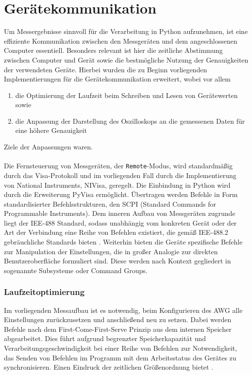 \documentclass[../Report.tex]{subfiles}
\begin{document}
\section{Gerätekommunikation}
\label{sec:vorg.geraete}

Um Messergebnisse sinnvoll für die Verarbeitung in Python aufzunehmen, ist eine effiziente Kommunikation zwischen den Messgeräten und dem angeschlossenen Computer essentiell. Besonders relevant ist hier die zeitliche Abstimmung zwischen Computer und Gerät sowie die bestmögliche Nutzung der Genauigkeiten der verwendeten Geräte. 
Hierbei wurden die zu Beginn vorliegenden Implementierungen für die Gerätekommunikation erweitert, wobei vor allem
\begin{enumerate}
	\item die Optimierung der Laufzeit beim Schreiben und Lesen von Gerätewerten sowie
	\item die Anpassung der Darstellung des Oszilloskops an die gemessenen Daten für eine höhere Genauigkeit
\end{enumerate}
Ziele der Anpassungen waren.
\\
\\
Die Fernsteuerung von Messgeräten, der \lstinline{Remote}-Modus, wird standardmäßig durch das Visa-Protokoll und im vorliegenden Fall durch die Implementierung von National Instruments, NIVisa, geregelt. Die Einbindung in Python wird durch die Erweiterung PyVisa ermöglicht. Übertragen werden Befehle in Form standardisierter Befehlsstrukturen, den SCPI (Standard Commands for Programmable Instruments). Dem inneren Aufbau von Messgeräten zugrunde liegt der IEE-488 Standard, sodass unabhängig vom konkreten Gerät oder der Art der Verbindung eine Reihe von Befehlen existiert, die gemäß IEE-488.2 gebräuchliche Standards bieten \cite[S. 224 ff.]{keysHand15}.
Weiterhin bieten die Geräte spezifische Befehle zur Manipulation der Einstellungen, die in großer Analogie zur direkten Benutzeroberfläche formuliert sind. Diese werden nach Kontext gegliedert in sogenannte Subsysteme oder Command Groups.


\subsubsection{Laufzeitoptimierung}
Im vorliegenden Messaufbau ist es notwendig, beim Konfigurieren des AWG alle Einstellungen zurückzusetzen und anschließend neu zu setzen. Dabei werden Befehle nach dem First-Come-First-Serve Prinzip aus dem internen Speicher abgearbeitet. Dies führt aufgrund begrenzter Speicherkapazität und Verarbeitungsgeschwindigkeit bei einer Reihe von Befehlen zur Notwendigkeit, das Senden von Befehlen im Programm mit dem Arbeitsstatus des Gerätes zu synchronisieren. Einen Eindruck der zeitlichen Größenordnung bietet .
\end{document}
